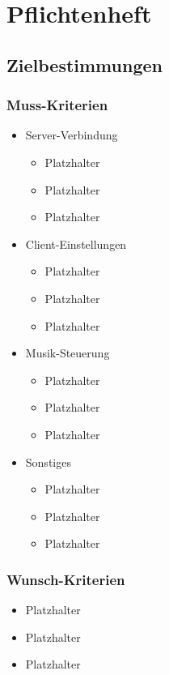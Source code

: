 \chapter{Pflichtenheft}
\section{Zielbestimmungen}
\subsection{Muss-Kriterien}
\renewcommand{\labelitemi}{•}
\begin{itemize}
	\item Server-Verbindung
	\begin{itemize}
		\item Platzhalter
		\item Platzhalter
		\item Platzhalter
	\end{itemize}
	\item Client-Einstellungen
	\begin{itemize}
		\item Platzhalter
		\item Platzhalter
		\item Platzhalter
	\end{itemize}
	\item Musik-Steuerung
	\begin{itemize}
		\item Platzhalter
		\item Platzhalter
		\item Platzhalter
	\end{itemize}
	\item Sonstiges
	\begin{itemize}
		\item Platzhalter
		\item Platzhalter
		\item Platzhalter
	\end{itemize}
\end{itemize}
\subsection{Wunsch-Kriterien}
\begin{itemize}
		\item Platzhalter
		\item Platzhalter
		\item Platzhalter
\end{itemize}

